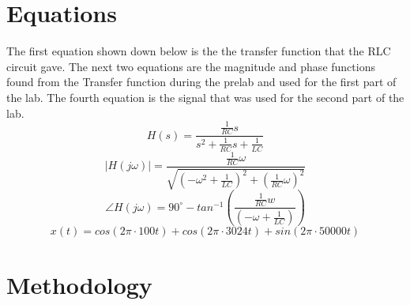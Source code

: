 \documentclass[12pt]{report}
\begin{document}
\section{Equations}
The first equation shown down below is the the transfer function that
the RLC circuit gave. The next two equations are the magnitude and 
phase functions found from the Transfer function during the prelab
and used for the first part of the lab. The fourth equation is the
signal that was used for the second part of the lab.
\begin{equation}
    H(s) = \frac{\frac{1}{RC}s}{s^{2} + \frac{1}{RC}s + \frac{1}{LC}}
\end{equation}
\begin{equation}
    |H(j\omega)| = \frac{\frac{1}{RC}\omega}{\sqrt{(-\omega^{2} + \frac{1}{LC})^{2}+(\frac{1}{RC}\omega)^2}}
\end{equation}
\begin{equation}
    \angle H(j\omega) = 90^{\circ} - tan^{-1}(\frac{\frac{1}{RC}w}{(-\omega + \frac{1}{LC})})
\end{equation}
\begin{equation}
     x(t) = cos(2\pi \cdot 100t) + cos(2\pi \cdot 3024t) + sin(2\pi \cdot 50000t)
\end{equation}
\section{Methodology}
\end{document}

